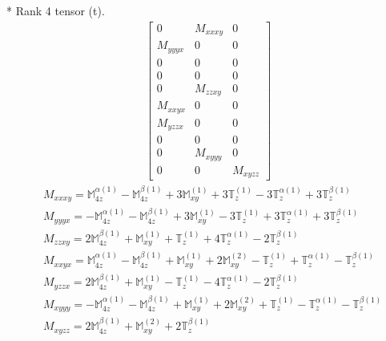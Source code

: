 \documentclass[fleqn,8pt,landscape]{jsarticle}
\begin{document}
* Rank 4 tensor (t).
\begin{align*}
\begin{bmatrix} 0 & M_{xxxy} & 0 \\ M_{yyyx} & 0 & 0 \\ 0 & 0 & 0 \\ 0 & 0 & 0 \\ 0 & M_{zzxy} & 0 \\ M_{xxyx} & 0 & 0 \\ M_{yzzx} & 0 & 0 \\ 0 & 0 & 0 \\ 0 & M_{xyyy} & 0 \\ 0 & 0 & M_{xyzz} \end{bmatrix}
\end{align*}
\begin{align*}
& M_{xxxy} = \mathbb{M}_{4z}^{\alpha(1)} - \mathbb{M}_{4z}^{\beta(1)} + 3 \mathbb{M}_{xy}^{(1)} + 3 \mathbb{T}_{z}^{(1)} - 3 \mathbb{T}_{z}^{\alpha(1)} + 3 \mathbb{T}_{z}^{\beta(1)} \\
& M_{yyyx} = - \mathbb{M}_{4z}^{\alpha(1)} - \mathbb{M}_{4z}^{\beta(1)} + 3 \mathbb{M}_{xy}^{(1)} - 3 \mathbb{T}_{z}^{(1)} + 3 \mathbb{T}_{z}^{\alpha(1)} + 3 \mathbb{T}_{z}^{\beta(1)} \\
& M_{zzxy} = 2 \mathbb{M}_{4z}^{\beta(1)} + \mathbb{M}_{xy}^{(1)} + \mathbb{T}_{z}^{(1)} + 4 \mathbb{T}_{z}^{\alpha(1)} - 2 \mathbb{T}_{z}^{\beta(1)} \\
& M_{xxyx} = \mathbb{M}_{4z}^{\alpha(1)} - \mathbb{M}_{4z}^{\beta(1)} + \mathbb{M}_{xy}^{(1)} + 2 \mathbb{M}_{xy}^{(2)} - \mathbb{T}_{z}^{(1)} + \mathbb{T}_{z}^{\alpha(1)} - \mathbb{T}_{z}^{\beta(1)} \\
& M_{yzzx} = 2 \mathbb{M}_{4z}^{\beta(1)} + \mathbb{M}_{xy}^{(1)} - \mathbb{T}_{z}^{(1)} - 4 \mathbb{T}_{z}^{\alpha(1)} - 2 \mathbb{T}_{z}^{\beta(1)} \\
& M_{xyyy} = - \mathbb{M}_{4z}^{\alpha(1)} - \mathbb{M}_{4z}^{\beta(1)} + \mathbb{M}_{xy}^{(1)} + 2 \mathbb{M}_{xy}^{(2)} + \mathbb{T}_{z}^{(1)} - \mathbb{T}_{z}^{\alpha(1)} - \mathbb{T}_{z}^{\beta(1)} \\
& M_{xyzz} = 2 \mathbb{M}_{4z}^{\beta(1)} + \mathbb{M}_{xy}^{(2)} + 2 \mathbb{T}_{z}^{\beta(1)}
\end{align*}
\end{document}
